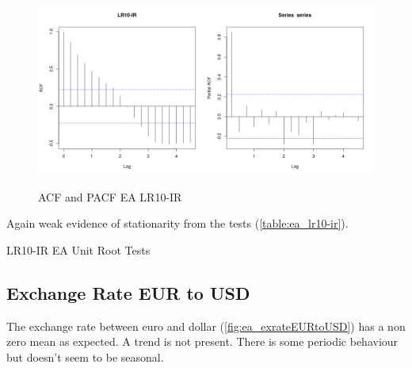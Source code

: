 \documentclass[10pt]{article}
\begin{document}
\begin{figure}[h!]
\centering
\includegraphics[width = 0.5\textwidth]{../acf/ea_LR10-IR}\includegraphics[width = 0.5\textwidth]{../pacf/ea_LR10-IR}
\caption{ACF and PACF EA LR10-IR}
\label{fig:ea_lr10-ir_acf}
\end{figure}

Again weak evidence of stationarity from the tests (\autoref{table:ea_lr10-ir}).

\begin{table}[h!]
\centering
{}
\caption{LR10-IR EA Unit Root Tests}
\label{table:ea_lr10-ir}
\end{table}



\subsection{Exchange Rate EUR to USD}
\label{subsec:exrate}

The exchange rate between euro and dollar (\autoref{fig:ea_exrateEURtoUSD}) has a non zero mean as expected. A trend is not present. There is some periodic behaviour but doesn't seem to be seasonal.
\end{document}
